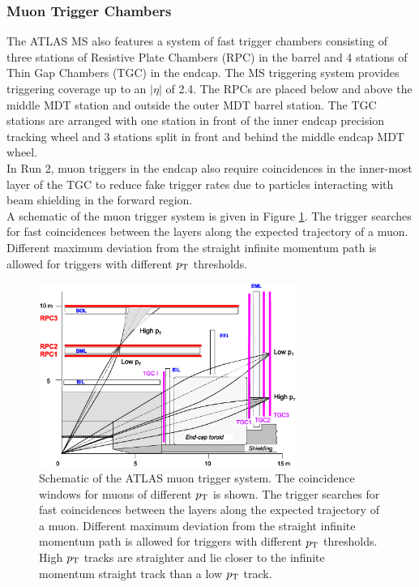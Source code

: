 \subsubsection*{Muon Trigger Chambers}

\indent  The ATLAS MS also features a system of fast trigger chambers consisting of three stations of Resistive Plate Chambers (RPC) in the barrel and 4 stations of Thin Gap Chambers (TGC) in the endcap.  The MS triggering system provides triggering coverage up to an $|\eta|$ of 2.4.  The RPCs are placed below and above the middle MDT station and outside the outer MDT barrel station.  The TGC stations are arranged with one station in front of the inner endcap precision tracking wheel and 3 stations split in front and behind the middle endcap MDT wheel.  \\

\indent In Run 2, muon triggers in the endcap also require coincidences in the inner-most layer of the TGC to reduce fake trigger rates due to particles interacting with beam shielding in the forward region. \\

\indent A schematic of the muon trigger system is given in Figure \ref{LHC:fig:MS_trigger}. The trigger searches for fast coincidences between the layers along the expected trajectory of a muon.  Different maximum deviation from the straight infinite momentum path is allowed for triggers with different $p_{\mathrm{T}}$ thresholds. \\

\begin{figure}[h!]
\centering
\includegraphics[width=0.75\textwidth, angle=0]{figures/LHC_ATLAS/RPC_TGC_schematics_5.eps}
\caption[~Schematic of the ATLAS muon trigger system]{ Schematic of the ATLAS muon trigger system.  The coincidence windows for muons of different $p_{\mathrm{T}}$ is shown.\cite{ATLAS_JINST} The trigger searches for fast coincidences between the layers along the expected trajectory of a muon.  Different maximum deviation from the straight infinite momentum path is allowed for triggers with different $p_{\mathrm{T}}$ thresholds. High $p_{\mathrm{T}}$ tracks are straighter and lie closer to the infinite momentum straight track than a low $p_{\mathrm{T}}$ track.  \label{LHC:fig:MS_trigger}}
\end{figure}

